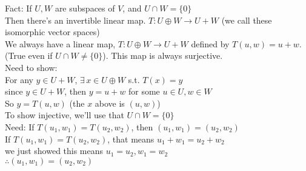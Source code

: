 \documentclass[11pt]{article}
\begin{document}
Fact: If $U, W$ are subspaces of $V$, and $U\cap W=\{0\}$\\
Then there's an invertible linear map. $T: U\oplus W\rightarrow U+W$ (we call these isomorphic vector spaces)\\
We always have a linear map, $T: U\oplus W\rightarrow U+W$ defined by $T(u, w)=u+w$. (True even if $U\cap W\neq \{0\}$). This map is always surjective.\\

Need to show:\\
For any $y\in U+W$, $\exists\, x\in U\oplus W$ s.t. $T(x)=y$\\
since $y\in U+W$, then $y=u+w$ for some $u\in U, w\in W$\\
So $y=T(u, w)$ (the $x$ above is $(u, w)$)\\

To show injective, we'll use that $U\cap W=\{0\}$\\
Need: If $T(u_1, w_1)=T(u_2, w_2)$, then $(u_1, w_1)=(u_2, w_2)$\\
If $T(u_1, w_1)=T(u_2, w_2)$, that means $u_1+w_1=u_2+w_2$\\
we just showed this means $u_1=u_2, w_1=w_2$\\
$\therefore (u_1, w_1)=(u_2, w_2)$
\end{document}
